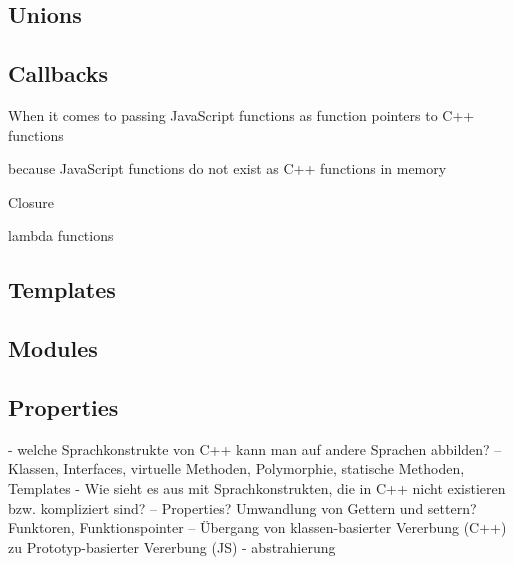 \subsection{Unions}

\subsection{Callbacks}

When it comes to passing JavaScript functions as function pointers to C++ functions

because JavaScript functions do not exist as C++ functions in memory

Closure

lambda functions

\subsection{Templates}

\subsection{Modules}

\subsection{Properties}








 - welche Sprachkonstrukte von C++ kann man auf andere Sprachen abbilden? 
 -- Klassen, Interfaces, virtuelle Methoden, Polymorphie, statische Methoden, Templates
 - Wie sieht es aus mit Sprachkonstrukten, die in C++ nicht existieren bzw. kompliziert sind?
 -- Properties? Umwandlung von Gettern und settern? Funktoren, Funktionspointer
 -- Übergang von klassen-basierter Vererbung (C++) zu Prototyp-basierter Vererbung (JS)
 - abstrahierung